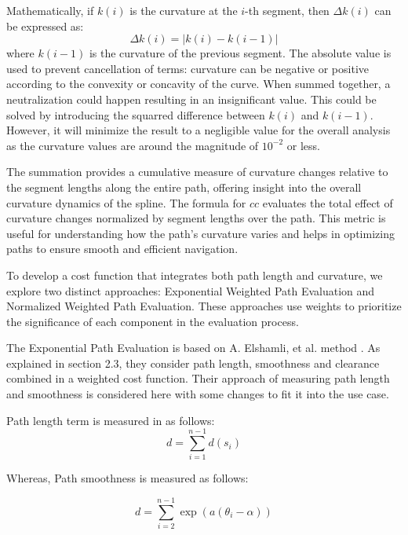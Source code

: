 Mathematically, if \(k(i)\) is the curvature at the \(i\)-th segment, then \( \Delta k(i) \) can be expressed as:
\begin{equation}
    \Delta k(i) = \left| k(i) - k(i-1) \right|
\end{equation}
where \(k(i-1)\) is the curvature of the previous segment. The absolute value is used to prevent cancellation of terms:
curvature can be negative or positive according to the convexity or concavity of the curve. When summed together,
a neutralization could happen resulting in an insignificant value. This could be solved by introducing the squarred 
difference between \(k(i)\) and \(k(i-1)\). However, it will minimize the result to a negligible value for the 
overall analysis as the curvature values are around the magnitude of \(10^{-2}\) or less.

The summation provides a cumulative measure of curvature changes relative to the segment lengths along the entire path, 
offering insight into the overall curvature dynamics of the spline. The formula for \(cc\) evaluates the total effect 
of curvature changes normalized by segment lengths over 
the path. This metric is useful for understanding how the path’s curvature varies and helps in optimizing paths 
to ensure smooth and efficient navigation.

To develop a cost function that integrates both path length and curvature, we explore two distinct approaches: 
Exponential Weighted Path Evaluation and Normalized Weighted Path Evaluation. These approaches use weights to 
prioritize the significance of each component in the evaluation process. 

The Exponential Path Evaluation is based on A. Elshamli, et al. method \cite{R17}. As explained in section 2.3,
they consider path length, smoothness and clearance combined in a weighted cost function.
Their approach of measuring path length and smoothness is considered here with some changes to fit it into the use case.

Path length term is measured in \cite{R17} as follows:
\begin{equation}
d = \sum_{i=1}^{n-1} d(s_i)
\end{equation}

Whereas, Path smoothness is measured as follows:

\begin{equation}
d = \sum_{i=2}^{n-1} \exp(a(\theta_i - \alpha))
\end{equation}

